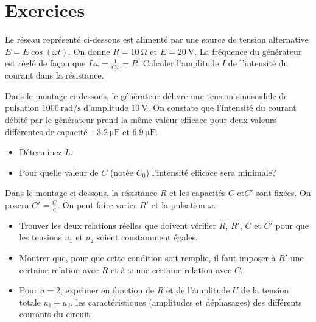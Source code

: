 \section{Exercices}%
\begin{exercice}
  Le réseau représenté ci-dessous est alimenté par une source de tension 
  alternative \(E = E \cos(\omega t)\). On donne \(R=\SI{10}{\ohm}\) et 
  \(E=\SI{20}{\volt}\). La fréquence du générateur est réglé de façon que 
  \(L\omega = \frac{1}{C\omega}=R\). Calculer l'amplitude \(I\) de 
  l'intensité du courant dans la résistance.
\end{exercice}
\begin{exercice}
  Dans le montage ci-dessous, le générateur délivre une tension sinusoïdale 
  de pulsation \(\SI{1000}{\radian\per\second}\) d'amplitude 
  \(\SI{10}{\volt}\). On constate que l'intensité du courant débité par le 
  générateur prend la même valeur efficace pour deux valeurs différentes de 
  capacité~: \(\SI{3,2}{\micro\farad}\) et \(\SI{6,9}{\micro\farad}\).
  \begin{itemize}
    \item Déterminez \(L\). \item Pour quelle valeur de \(C\) (notée \(C_0\)) 
      l'intensité efficace sera minimale?
  \end{itemize}
\end{exercice}
\begin{exercice}[Dipôles \(R, C\)]
  Dans le montage ci-dessous, la résistance \(R\) et les capacités \(C\) 
  et\(C'\) sont fixées. On posera \(C'=\frac{C}{a}\). On peut faire varier 
  \(R'\) et la pulsation \(\omega\).
  \begin{itemize}
    \item Trouver les deux relations réelles que doivent vérifier \(R\), 
      \(R'\), \(C\) et \(C'\) pour que les tensions \(u_1\) et \(u_2\) 
      soient constamment égales.
    \item Montrer que, pour que cette condition soit remplie, il faut imposer 
      à \(R'\) une certaine relation avec \(R\) et à \(\omega\) une 
      certaine relation avec \(C\).
    \item Pour \(a=2\), exprimer en fonction de \(R\) et de l'amplitude \(U\) 
      de la tension totale \(u_1+u_2\), les caractéristiques (amplitudes et 
      déphasages) des différents courants du circuit.
  \end{itemize}
\end{exercice}
